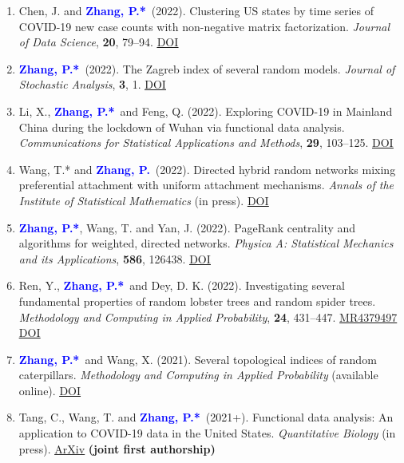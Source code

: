 \documentclass{res}
\def\MR#1{\href{http://www.ams.org/mathscinet-getitem?mr=#1}{MR#1}}
\newcommand{\PZ}{\textbf{\textcolor{blue}{Zhang, P.*}}}
\newcommand{\PZnot}{\textbf{\textcolor{blue}{Zhang, P.}}}
\begin{document}
\begin{resume}
\begin{enumerate}
	\item {\sc Chen, J.} and \PZ\ (2022). Clustering US states by 
	time series of COVID-19 new case counts with non-negative matrix 
	factorization. {\em Journal of Data Science}, {\bf 20}, 79--94.
	\href{https://doi.org/10.6339/22-JDS1036}{\underline{DOI}}
	
	\item \PZ\ (2022). The Zagreb index of several random models. 
	{\em Journal of Stochastic Analysis}, {\bf 3}, 1. 
	\href{https://doi.org/10.31390/josa.3.1.01}{\underline{DOI}}
	
	\item {\sc Li, X.}, \PZ\ and {\sc Feng, Q.} (2022). Exploring 
	COVID-19 in Mainland China during the lockdown of Wuhan via 
	functional data analysis. {\em Communications for Statistical 
	Applications and Methods}, {\bf 29}, 103--125. 
	\href{https://doi.org/10.29220/CSAM.2022.29.1.103}
	{\underline{DOI}}
	
	\item {\sc Wang, T.*} and \PZnot\ (2022). Directed 
	hybrid random networks mixing preferential attachment with 
	uniform attachment mechanisms. {\em Annals of the Institute of 
	Statistical Mathematics} (in press). 
	\href{https://doi.org/10.1007/s10463-022-00827-5}
	{\underline{DOI}}
	
	\item \PZ, {\sc Wang, T.} and {\sc Yan, J.} (2022). PageRank 
	centrality and algorithms for weighted, directed networks. {\em 
	Physica A: Statistical Mechanics and its Applications}, {\bf 
	586}, 126438. 
	\href{https://doi.org/10.1016/j.physa.2021.126438}
	{\underline{DOI}}
	
	\item {\sc Ren, Y.}, \PZ\ and {\sc Dey, D. K.} (2022). 
	Investigating several fundamental properties of random 
	lobster trees and random spider trees. {\em Methodology and 
		Computing in Applied Probability}, {\bf 24}, 431--447. 
	\MR{4379497} \href{https://doi.org/10.1007/s11009-021-09863-9}
	{\underline{DOI}}
	
	\item \PZ\ and {\sc Wang, X.} (2021). Several 
	topological indices of random caterpillars. 
	{\em Methodology and Computing in Applied Probability} 
	(available online). 
	\href{https://doi.org/10.1007/s11009-021-09895-1}
	{\underline{DOI}} 
	
	\item {\sc Tang, C., Wang, T.} and \PZ\ (2021+). 
	Functional data analysis: An application to COVID-19 data in
	the United States. {\em Quantitative Biology} (in press).
	\href{https://arxiv.org/pdf/2009.08363.pdf}
	{\underline{ArXiv}} {\bf \small (joint first authorship)}
	

\end{enumerate}
\end{resume}
\end{document}
